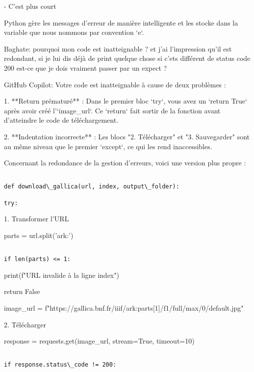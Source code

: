 - C'est plus court

Python gère les messages d'erreur de manière intelligente et les stocke dans la variable que nous nommons par convention `e`.

Baghate: pourquoi mon code est inatteignable ? et j'ai l'impression qu'il est redondant, si je lui dis déjà de print quelque chose si c'ets différent de status code 200 est-ce que je dois vraiment passer par un expect ?

GitHub Copilot: Votre code est inatteignable à cause de deux problèmes :

1. **Return prématuré** : Dans le premier bloc `try`, vous avez un `return True` après avoir créé l'`image\_url`. Ce `return` fait sortir de la fonction avant d'atteindre le code de téléchargement.

2. **Indentation incorrecte** : Les blocs "2. Télécharger" et "3. Sauvegarder" sont au même niveau que le premier `except`, ce qui les rend inaccessibles.

Concernant la redondance de la gestion d'erreurs, voici une version plus propre :

\begin{verbatim}

def download\_gallica(url, index, output\_folder):

try:

\end{verbatim}

  1. Transformer l'URL

parts = url.split('ark:')

\begin{verbatim}

if len(parts) <= 1:

\end{verbatim}

print(f"URL invalide à la ligne {index}")

return False

image\_url = f"https://gallica.bnf.fr/iiif/ark:{parts[1]}/f1/full/max/0/default.jpg"

  2. Télécharger

response = requests.get(image\_url, stream=True, timeout=10)

\begin{verbatim}

if response.status\_code != 200:

\end{verbatim}

